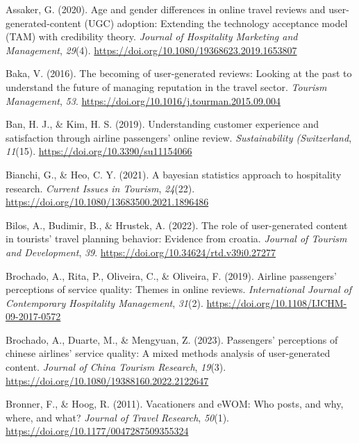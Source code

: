 \documentclass[
]{agujournal2019}
\newlength{\cslhangindent}
\newenvironment{CSLReferences}[2] %
 {\begin{list}{}{%
  \setlength{\itemindent}{0pt}
  \setlength{\leftmargin}{0pt}
  \setlength{\parsep}{0pt}
  \ifodd #1
   \setlength{\leftmargin}{\cslhangindent}
   \setlength{\itemindent}{-1\cslhangindent}
  \fi
  \setlength{\itemsep}{#2\baselineskip}}}
 {\end{list}}
\begin{document}
\label{refs}
\begin{CSLReferences}{1}{0}
\vspace{1em}

Assaker, G. (2020). Age and gender differences in online travel reviews
and user-generated-content (UGC) adoption: Extending the technology
acceptance model (TAM) with credibility theory. \emph{Journal of
Hospitality Marketing and Management}, \emph{29}(4).
\url{https://doi.org/10.1080/19368623.2019.1653807}

Baka, V. (2016). The becoming of user-generated reviews: Looking at the
past to understand the future of managing reputation in the travel
sector. \emph{Tourism Management}, \emph{53}.
\url{https://doi.org/10.1016/j.tourman.2015.09.004}

Ban, H. J., \& Kim, H. S. (2019). Understanding customer experience and
satisfaction through airline passengers' online review.
\emph{Sustainability (Switzerland}, \emph{11}(15).
\url{https://doi.org/10.3390/su11154066}

Bianchi, G., \& Heo, C. Y. (2021). A bayesian statistics approach to
hospitality research. \emph{Current Issues in Tourism}, \emph{24}(22).
\url{https://doi.org/10.1080/13683500.2021.1896486}

Bilos, A., Budimir, B., \& Hrustek, A. (2022). The role of
user-generated content in tourists' travel planning behavior: Evidence
from croatia. \emph{Journal of Tourism and Development}, \emph{39}.
\url{https://doi.org/10.34624/rtd.v39i0.27277}

Brochado, A., Rita, P., Oliveira, C., \& Oliveira, F. (2019). Airline
passengers' perceptions of service quality: Themes in online reviews.
\emph{International Journal of Contemporary Hospitality Management},
\emph{31}(2). \url{https://doi.org/10.1108/IJCHM-09-2017-0572}

Brochado, A., Duarte, M., \& Mengyuan, Z. (2023). Passengers'
perceptions of chinese airlines' service quality: A mixed methods
analysis of user-generated content. \emph{Journal of China Tourism
Research}, \emph{19}(3).
\url{https://doi.org/10.1080/19388160.2022.2122647}

Bronner, F., \& Hoog, R. (2011). Vacationers and eWOM: Who posts, and
why, where, and what? \emph{Journal of Travel Research}, \emph{50}(1).
\url{https://doi.org/10.1177/0047287509355324}


\end{CSLReferences}
\end{document}
